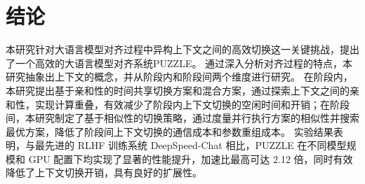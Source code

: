 \section{结论}
本研究针对大语言模型对齐过程中异构上下文之间的高效切换这一关键挑战，提出了一个高效的大语言模型对齐系统PUZZLE。
通过深入分析对齐过程的特点，本研究抽象出上下文的概念，并从阶段内和阶段间两个维度进行研究。
在阶段内，本研究提出基于亲和性的时间共享切换方案和混合方案，通过探索上下文之间的亲和性，实现计算重叠，有效减少了阶段内上下文切换的空闲时间和开销；在阶段间，本研究制定了基于相似性的切换策略，通过度量并行执行方案的相似性并搜索最优方案，降低了阶段间上下文切换的通信成本和参数重组成本。
实验结果表明，与最先进的 RLHF 训练系统 DeepSpeed-Chat 相比，PUZZLE 在不同模型规模和 GPU 配置下均实现了显著的性能提升，加速比最高可达 2.12 倍，同时有效降低了上下文切换开销，具有良好的扩展性。
